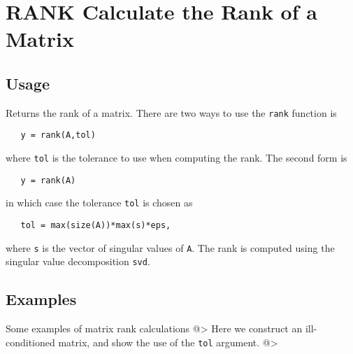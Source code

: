 \section{RANK Calculate the Rank of a Matrix}

\subsection{Usage}

Returns the rank of a matrix.  There are two ways to use
the \verb|rank| function is
\begin{verbatim}
   y = rank(A,tol)
\end{verbatim}
where \verb|tol| is the tolerance to use when computing the
rank.  The second form is
\begin{verbatim}
   y = rank(A)
\end{verbatim}
in which case the tolerance \verb|tol| is chosen as
\begin{verbatim}
   tol = max(size(A))*max(s)*eps,
\end{verbatim}
where \verb|s| is the vector of singular values of \verb|A|.  The
rank is computed using the singular value decomposition \verb|svd|.
\subsection{Examples}

Some examples of matrix rank calculations
@>
Here we construct an ill-conditioned matrix, and show the use 
of the \verb|tol| argument.
@>
